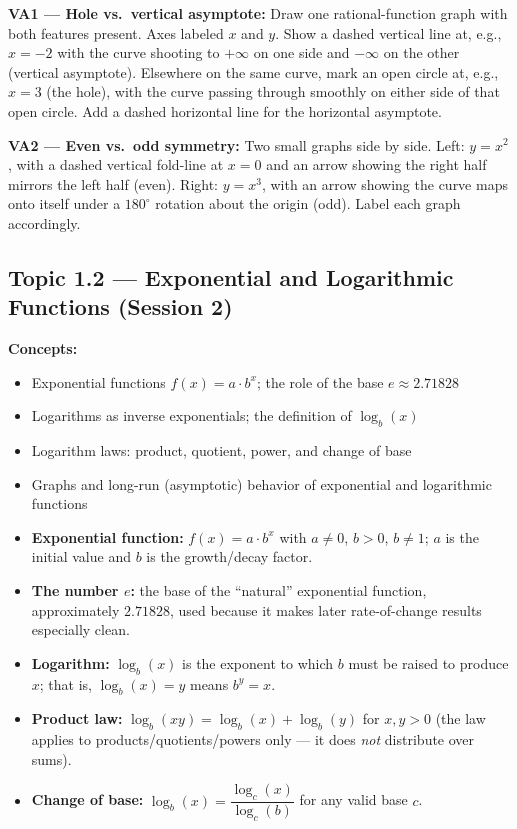 \documentclass{article}
\begin{document}
\begin{instrnote}
\textbf{VA1 --- Hole vs.\ vertical asymptote:} Draw one rational-function graph with both features present. Axes labeled $x$ and $y$. Show a dashed vertical line at, e.g., $x=-2$ with the curve shooting to $+\infty$ on one side and $-\infty$ on the other (vertical asymptote). Elsewhere on the same curve, mark an open circle at, e.g., $x=3$ (the hole), with the curve passing through smoothly on either side of that open circle. Add a dashed horizontal line for the horizontal asymptote.

\textbf{VA2 --- Even vs.\ odd symmetry:} Two small graphs side by side. Left: $y=x^2$, with a dashed vertical fold-line at $x=0$ and an arrow showing the right half mirrors the left half (even). Right: $y=x^3$, with an arrow showing the curve maps onto itself under a $180^\circ$ rotation about the origin (odd). Label each graph accordingly.
\end{instrnote}

\subsection{Topic 1.2 --- Exponential and Logarithmic Functions (Session 2)}

\textbf{Concepts:}
\begin{itemize}[leftmargin=*]
  \item Exponential functions $f(x)=a\cdot b^x$; the role of the base $e\approx2.71828$
  \item Logarithms as inverse exponentials; the definition of $\log_b(x)$
  \item Logarithm laws: product, quotient, power, and change of base
  \item Graphs and long-run (asymptotic) behavior of exponential and logarithmic functions
\end{itemize}

\begin{keydefs}
\begin{itemize}[leftmargin=*]
  \item \textbf{Exponential function:} $f(x)=a\cdot b^x$ with $a\neq0$, $b>0$, $b\neq1$; $a$ is the initial value and $b$ is the growth/decay factor.
  \item \textbf{The number $e$:} the base of the ``natural'' exponential function, approximately $2.71828$, used because it makes later rate-of-change results especially clean.
  \item \textbf{Logarithm:} $\log_b(x)$ is the exponent to which $b$ must be raised to produce $x$; that is, $\log_b(x)=y$ means $b^y=x$.
  \item \textbf{Product law:} $\log_b(xy)=\log_b(x)+\log_b(y)$ for $x,y>0$ (the law applies to products/quotients/powers only --- it does \emph{not} distribute over sums).
  \item \textbf{Change of base:} $\log_b(x)=\dfrac{\log_c(x)}{\log_c(b)}$ for any valid base $c$.
\end{itemize}
\end{keydefs}
\end{document}

